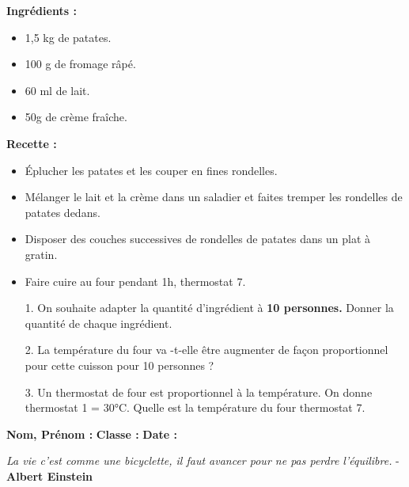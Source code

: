 \begin{minipage}[t]{0.45\textwidth}
  \textbf{Ingrédients : }
  \begin{itemize}
    \item 1,5 kg de patates.
    \item 100 g de fromage râpé.
    \item 60 ml de lait.
    \item 50g de crème fraîche.
  \end{itemize}

\end{minipage}
\begin{minipage}[t]{0.5\textwidth}
  \textbf{Recette :}
  \begin{itemize}
    \item Éplucher les patates et les couper en fines rondelles.
    \item Mélanger le lait et la crème dans un saladier et faites tremper les rondelles de patates dedans.
    \item Disposer des couches successives de rondelles de patates dans un plat à gratin. 
    \item Faire cuire au four pendant 1h, thermostat 7.
  \end{itemize}
\end{minipage}

\begin{enumerate}
  \item[1.] On souhaite adapter la quantité d'ingrédient à \textbf{10 personnes.} Donner la quantité de chaque ingrédient. \\ \Pointilles[7] 
  \item[2.] La température du four va -t-elle être augmenter de façon proportionnel pour cette cuisson pour 10 personnes ?  \\ \Pointilles[2] 
  \item[3.] Un thermostat de four est proportionnel à la température. On donne thermostat 1 = 30°C. Quelle est la température du four thermostat 7. \\ \Pointilles[3] 
\end{enumerate}

\newpage


\textbf{Nom, Prénom :} \hspace{8cm} \textbf{Classe :} \hspace{3cm} \textbf{Date :}\\

\begin{center}
  \textit{La vie c’est comme une bicyclette, il faut avancer pour ne pas perdre l’équilibre.} - \textbf{Albert Einstein}
\end{center}

